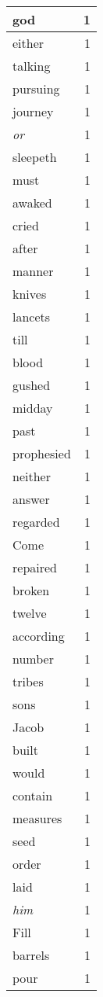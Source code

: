 \begin{center}
\begin{longtable}{l|r}
god & 1\\ \hline 
either & 1\\ \hline 
talking & 1\\ \hline 
pursuing & 1\\ \hline 
journey & 1\\ \hline 
\emph{or} & 1\\ \hline 
sleepeth & 1\\ \hline 
must & 1\\ \hline 
awaked & 1\\ \hline 
cried & 1\\ \hline 
after & 1\\ \hline 
manner & 1\\ \hline 
knives & 1\\ \hline 
lancets & 1\\ \hline 
till & 1\\ \hline 
blood & 1\\ \hline 
gushed & 1\\ \hline 
midday & 1\\ \hline 
past & 1\\ \hline 
prophesied & 1\\ \hline 
neither & 1\\ \hline 
answer & 1\\ \hline 
regarded & 1\\ \hline 
Come & 1\\ \hline 
repaired & 1\\ \hline 
broken & 1\\ \hline 
twelve & 1\\ \hline 
according & 1\\ \hline 
number & 1\\ \hline 
tribes & 1\\ \hline 
sons & 1\\ \hline 
Jacob & 1\\ \hline 
built & 1\\ \hline 
would & 1\\ \hline 
contain & 1\\ \hline 
measures & 1\\ \hline 
seed & 1\\ \hline 
order & 1\\ \hline 
laid & 1\\ \hline 
\emph{him} & 1\\ \hline 
Fill & 1\\ \hline 
barrels & 1\\ \hline 
pour & 1\\ \hline 

\end{longtable}
\end{center}
